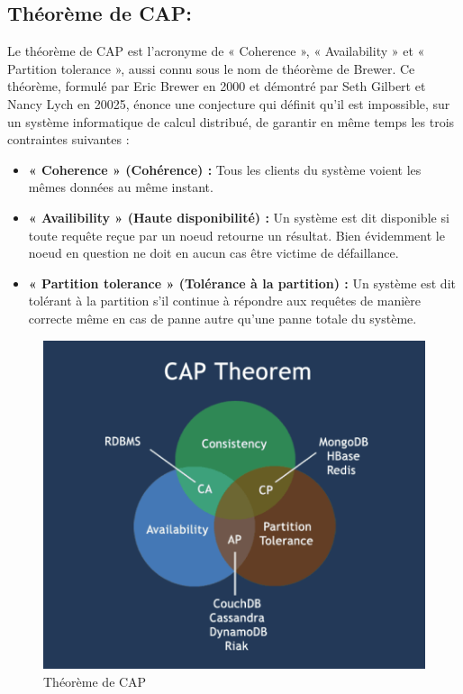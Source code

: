 \subsection{Théorème de CAP: }
Le théorème de CAP est l’acronyme de « Coherence », « Availability » et « Partition tolerance », aussi connu sous le nom de théorème de Brewer. Ce théorème, formulé par Eric Brewer en 2000 et démontré par Seth Gilbert et Nancy Lych en 20025, énonce une conjecture qui définit qu’il est impossible, sur un système informatique de calcul distribué, de garantir en même temps les trois contraintes suivantes :

\begin{itemize}[label=\textbullet]
\item \textbf{« Coherence » (Cohérence) :} Tous les clients du système voient les mêmes données au même instant.
\item \textbf{« Availibility » (Haute disponibilité) :} Un système est dit disponible si toute requête reçue par un noeud retourne un résultat. Bien évidemment le noeud en question ne doit en aucun cas être victime de défaillance.
\item \textbf{« Partition tolerance » (Tolérance à la partition) :} Un système est dit tolérant à la partition s’il continue à répondre aux requêtes de manière correcte même en cas de panne autre qu’une panne totale du système.
\end{itemize}

\begin{figure}[h]
	\centering
    \includegraphics[scale=0.5]{img/4.1}
    \caption{Théorème de CAP}
\end{figure}

